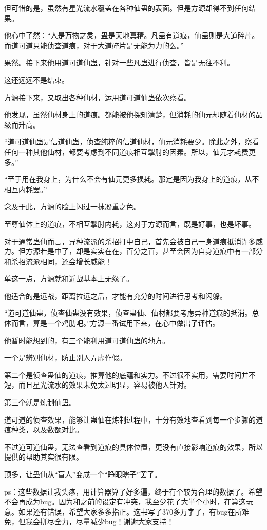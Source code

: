 \begin{this_body}
但可惜的是，虽然有星光流水覆盖在各种仙蛊的表面。但是方源却得不到任何结果。

他心中了然：“人是万物之灵，蛊是天地真精。凡蛊有道痕，仙蛊则是大道碎片。而道可道只能侦查道痕，对于大道碎片是无能为力的么。”

果然。接下来他用道可道仙蛊，针对一些凡蛊进行侦查，皆是无往不利。

这还远远不是结束。

方源接下来，又取出各种仙材，运用道可道仙蛊依次察看。

他发现，虽然仙材身上的道痕。都能被他探知清楚，但消耗的仙元却随着仙材的品级而升高。

“道可道仙蛊是信道仙蛊，侦查纯粹的信道仙材，仙元消耗要少。除此之外，察看任何一种其他仙材，都要考虑到不同道痕相互掣肘的因素。所以，仙元才耗费更多。”

“至于用在我身上，为什么不会有仙元更多损耗。那定是因为我身上的道痕，从不相互内耗罢。”

念及于此，方源的脸上闪过一抹凝重之色。

至尊仙体上的道痕，不相互掣肘内耗，这对于方源而言，既是好事，也是坏事。

对于通常蛊仙而言，异种流派的杀招打中自己，首先会被自己一身道痕抵消许多威力。但方源若是中了，却是实实在在，百分之百，甚至会因为自身道痕中有一部分和杀招流派相同，还会增长威能！

单这一点，方源就和近战基本上无缘了。

他适合的是远战，距离拉远之后，才能有充分的时间进行思考和闪躲。

“道可道仙蛊，侦查仙蛊没有效果，侦查蛊仙、仙材都要考虑异种道痕的抵消。总体而言，算是一个鸡肋吧。”方源一番试用下来，在心中做出了评估。

他暂时能想到的，有三个能利用道可道仙蛊的地方。

一个是辨别仙材，防止别人弄虚作假。

第二个是侦查蛊仙的道痕，推算他的底蕴和实力。不过很不实用，需要时间并不短，而且星光流水的效果未免太过明显，容易被他人针对。

第三个就是炼制仙蛊。

道可道的侦查效果，能够让蛊仙在炼制过程中，十分有效地查看到每一个步骤的道痕种类，以及数额对比。

不过道可道仙蛊，无法查看到道痕的具体位置，更没有直接影响道痕的效果，所以提供的帮助其实很有限。

顶多，让蛊仙从“盲人”变成一个“睁眼瞎子”罢了。

ps：这些数据让我头疼，用计算器算了好多遍，终于有个较为合理的数据了。希望不会再成为bug。因为和之前的设定有冲突，我至少花了大半个小时，在算这玩意。如果还有错误，希望大家多多指正。这书写了370多万字了，有bug在所难免，但我会拼尽全力，尽量减少bug！谢谢大家支持！

\end{this_body}

